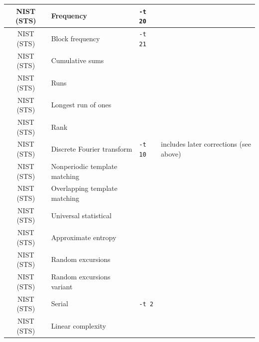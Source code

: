 \documentclass[12pt,a4paper,fullpage]{article}
\begin{document}
\begin{longtable}{|c|>{\raggedright\arraybackslash}p{3cm}|l|>{\raggedright\arraybackslash}p{4cm}|}
\hline

NIST (STS)&Frequency & \texttt{-t 20}& \\ \hline %
NIST (STS)&Block frequency&\texttt{-t 21}  &\\ \hline %
NIST (STS)&Cumulative sums & & \\ \hline %
NIST (STS)&Runs & & \\ \hline %
NIST (STS)&Longest run of ones & & \\ \hline %
NIST (STS)&Rank & & \\ \hline %
NIST (STS)&Discrete Fourier transform &\texttt{-t 10} & includes later corrections (see above)\\ \hline %
NIST (STS)&Nonperiodic template matching& & \\ \hline %
NIST (STS)&Overlapping template matching& & \\ \hline %
NIST (STS)&Universal statistical & & \\ \hline %
NIST (STS)&Approximate entropy & & \\ \hline %
NIST (STS)&Random excursions & & \\ \hline %
NIST (STS)&Random excursions variant & & \\ \hline %
NIST (STS)&Serial & \texttt{-t 2} & \\ \hline %
NIST (STS)&Linear complexity & & \\ \hline %



\end{longtable}
\end{document}
